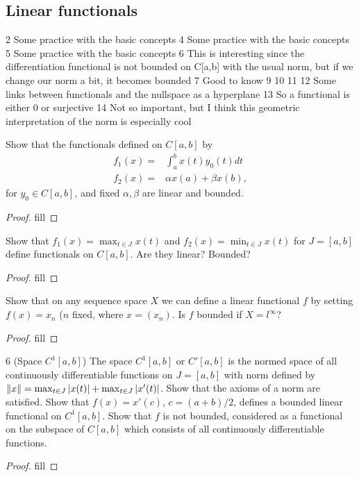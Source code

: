 \subsection{Linear functionals}

2 Some practice with the basic concepts
4 Some practice with the basic concepts
5 Some practice with the basic concepts
6 This is interesting since the differentiation functional is not bounded on C[a,b] with the usual norm, but if we change our norm a bit, it becomes bounded 
7 Good to know
9
10
11 
12 Some links between functionals and the nullspace as a hyperplane
13 So a functional is either 0 or surjective 
14 Not so important, but I think this geometric interpretation of the norm is especially cool

\begin{exercise}{2}
Show that the functionals defined on $C[a,b]$ by 
\begin{align*}
    f_1(x) =& \int_a^b x(t)y_0(t)dt\\
    f_2(x) =& \alpha x(a) +\beta x(b),
\end{align*}
for $y_0\in C[a,b]$, and fixed $\alpha,\beta$ are linear and bounded.
\end{exercise}
\begin{proof}
fill
\end{proof}

\begin{exercise}{4}
Show that $f_1(x)=\max_{t\in J} x(t)$ and $f_2(x)=\min_{t\in J} x(t)$ for $J=[a,b]$ define functionals on $C[a,b]$. 
Are they linear? Bounded?
\end{exercise}
\begin{proof}
fill
\end{proof}

\begin{exercise}{5}
Show that on any sequence space $X$ we can define a linear functional $f$ by setting $f(x)=x_n$ ($n$ fixed, where $x=(x_n)$. 
Is $f$ bounded if $X=l^\infty$?
\end{exercise}
\begin{proof}
fill
\end{proof}

\begin{exercise}{6 (Space $C^1[a,b]$)}
The space $C^1[a,b]$ or $C'[a,b]$ is the normed space of all continuously differentiable functions on $J=[a,b]$ with norm defined by $\left\lVert x\right\rVert=\max_{t\in J}\left\lvert x(t)\right\rvert+\max_{t\in J}\left\lvert x'(t)\right\rvert$. Show that the axioms of a norm are satisfied. 
Show that $f(x)=x'(c)$, $c=(a+b)/2$, defines a bounded linear functional on $C^1[a,b]$. 
Show that $f$ is not bounded, considered as a functional on the subspace of $C[a,b]$ which consists of all continuously differentiable functions.
\end{exercise}
\begin{proof}
fill
\end{proof}

